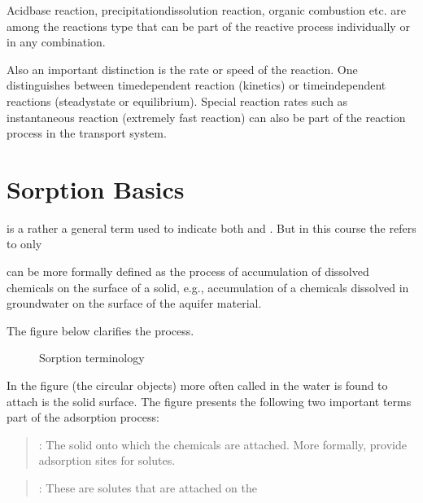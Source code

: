 \documentclass[letterpaper,10pt,english]{jupyterBook}
\begin{document}
\sphinxAtStartPar
Acid\sphinxhyphen{}base reaction, precipitation\sphinxhyphen{}dissolution reaction, organic combustion etc. are among the reactions type that can be part of the reactive process individually or in any combination.

\sphinxAtStartPar
Also an important distinction is the rate or speed of the reaction. One distinguishes between time\sphinxhyphen{}dependent reaction (kinetics) or time\sphinxhyphen{}independent reactions (steady\sphinxhyphen{}state or equilibrium). Special reaction rates such as instantaneous reaction (extremely fast reaction) can also be part of the reaction process in the transport system.


\section{Sorption Basics}
\label{\detokenize{content/transport/L10/22_reactive_transport:sorption-basics}}
\sphinxAtStartPar
{} is a rather a general term used to indicate both  and . But in this course the  refers to only 

\sphinxAtStartPar
{} can be more formally defined as the process of accumulation of dissolved chemicals on the surface of a solid, e.g., accumulation of a chemicals dissolved in groundwater on the surface of the aquifer material.

\sphinxAtStartPar
The figure below clarifies the  process.

\begin{figure}[htbp]
\centering
\capstart

\noindent{}
\caption{Sorption terminology}\label{\detokenize{content/transport/L10/22_reactive_transport:sorption}}\end{figure}

\sphinxAtStartPar
In the figure  (the circular objects) more often called  in the water is found to attach is the solid surface. The figure presents the following two important terms part of the adsorption process:
\begin{quote}

\sphinxAtStartPar
{}: The solid onto which the chemicals are attached. More formally,  provide adsorption sites for solutes.
\end{quote}
\begin{quote}

\sphinxAtStartPar
{}: These are solutes that are attached on the 
\end{quote}
\end{document}
